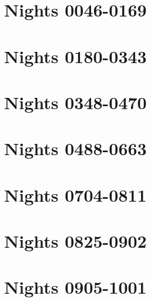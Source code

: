 \documentclass[a4paper,12pt,]{book}
\begin{document}
\chapter{Nights 0046-0169}
\newpage


\chapter{Nights 0180-0343}
\newpage


\chapter{Nights 0348-0470}
\newpage


\chapter{Nights 0488-0663}
\newpage


\chapter{Nights 0704-0811}
\newpage


\chapter{Nights 0825-0902}
\newpage


\chapter{Nights 0905-1001}
\newpage


\nocite{mardrus1959mille} %
\nocite{mardrus2002book}

\cleardoublepage
{} %

\end{document}
